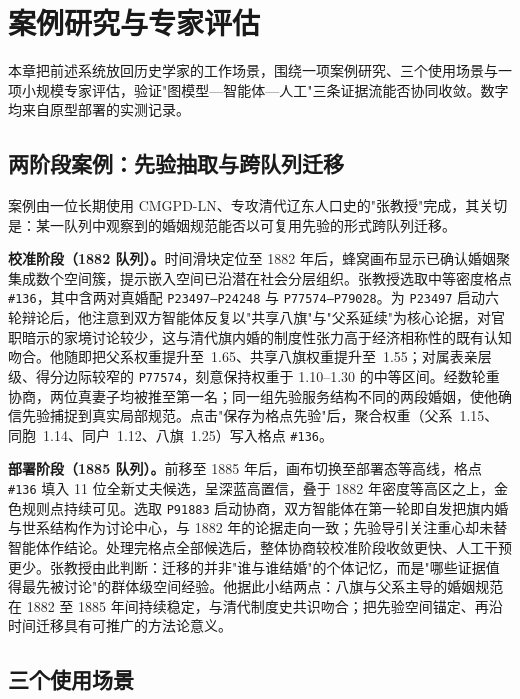 \chapter{案例研究与专家评估}\label{chap:case}

本章把前述系统放回历史学家的工作场景，围绕一项案例研究、三个使用场景与一项小规模专家评估，验证"图模型—智能体—人工"三条证据流能否协同收敛。数字均来自原型部署的实测记录。

\section{两阶段案例：先验抽取与跨队列迁移}\label{sec:case-zhang}

案例由一位长期使用 CMGPD-LN、专攻清代辽东人口史的"张教授"完成，其关切是：某一队列中观察到的婚姻规范能否以可复用先验的形式跨队列迁移。

\textbf{校准阶段（1882 队列）。}时间滑块定位至 1882 年后，蜂窝画布显示已确认婚姻聚集成数个空间簇，提示嵌入空间已沿潜在社会分层组织。张教授选取中等密度格点 \texttt{\#136}，其中含两对真婚配 \texttt{P23497--P24248} 与 \texttt{P77574--P79028}。为 \texttt{P23497} 启动六轮辩论后，他注意到双方智能体反复以"共享八旗"与"父系延续"为核心论据，对官职暗示的家境讨论较少，这与清代旗内婚的制度性张力高于经济相称性的既有认知吻合。他随即把父系权重提升至~1.65、共享八旗权重提升至~1.55；对属表亲层级、得分边际较窄的 \texttt{P77574}，刻意保持权重于 1.10–1.30 的中等区间。经数轮重协商，两位真妻子均被推至第一名；同一组先验服务结构不同的两段婚姻，使他确信先验捕捉到真实局部规范。点击"保存为格点先验"后，聚合权重（父系~1.15、同胞~1.14、同户~1.12、八旗~1.25）写入格点 \texttt{\#136}。

\textbf{部署阶段（1885 队列）。}前移至 1885 年后，画布切换至部署态等高线，格点 \texttt{\#136} 填入 11 位全新丈夫候选，呈深蓝高置信，叠于 1882 年密度等高区之上，金色规则点持续可见。选取 \texttt{P91883} 启动协商，双方智能体在第一轮即自发把旗内婚与世系结构作为讨论中心，与 1882 年的论据走向一致；先验导引关注重心却未替智能体作结论。处理完格点全部候选后，整体协商较校准阶段收敛更快、人工干预更少。张教授由此判断：迁移的并非"谁与谁结婚"的个体记忆，而是"哪些证据值得最先被讨论"的群体级空间经验。他据此小结两点：八旗与父系主导的婚姻规范在 1882 至 1885 年间持续稳定，与清代制度史共识吻合；把先验空间锚定、再沿时间迁移具有可推广的方法论意义。

\section{三个使用场景}\label{sec:case-uc}

